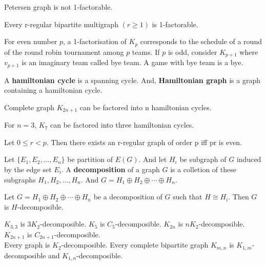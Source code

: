 \begin{theorem}
	Petersen graph is not 1-factorable.
\end{theorem}

\begin{theorem}
	Every r-regular bipartite multigraph $(r \ge 1)$ is 1-factorable.
\end{theorem}

\begin{remark}
	For even number $p$, a 1-factorisation of $K_p$ corresponds to the schedule of a round of the round robin tournament among $p$ teams.
	If $p$ is odd, consider $K_{p+1}$ where $v_{p+1}$ is an imaginary team called bye team.
	A game with bye team is a bye.
\end{remark}

\begin{definition}
	A \textbf{hamiltonian cycle} is a spanning cycle.
	And, \textbf{Hamiltonian graph} is a graph containing a hamiltonian cycle.
\end{definition}

\begin{theorem}
	Complete graph $K_{2n+1}$ can be factored into n hamiltonian cycles.
\end{theorem}

\begin{remark}
	For $n=3$, $K_7$ can be factored into three hamiltonian cycles.
\end{remark}

\begin{theorem}
	Let $0 \le r < p$.
	Then there exists an r-regular graph of order p iff pr is even.
\end{theorem}

\begin{definition}
	Let $\{E_1, E_2, \dots, E_n \}$ be partition of $E(G)$.
	And let $H_i$ be subgraph of $G$ induced by the edge set $E_i$.
	A \textbf{decomposition} of a graph $G$ is a colletion of these subgraphs $H_1, H_2, \dots, H_n$.
	And $G = H_1 \oplus H_2 \oplus \dotsb \oplus H_n$.
\end{definition}

\begin{definition}
	Let $G = H_1 \oplus H_2 \oplus \dotsb \oplus H_n$ be a decomposition of $G$ such that $H \cong H_i$.
	Then $G$ is $H$-decomposible.
\end{definition}

\begin{remark}
	$K_{3,3}$ is $3K_2$-decomposible.
	$K_5$ is $C_5$-decomposible.
	$K_{2n}$ is $nK_2$-decomposible.
	$K_{2n+1}$ is $C_{2n+1}$-decomposible.\\
	Every graph is $K_2$-decomposible.
	Every complete bipartite graph $K_{m,n}$ is $K_{1,m}$-decomposible and $K_{1,n}$-decomposible.
\end{remark}

